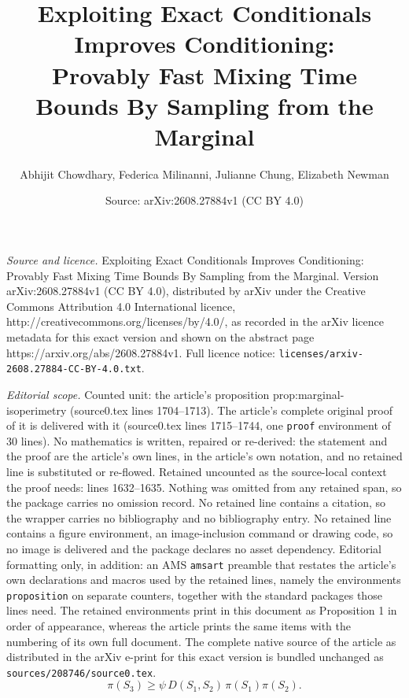 \documentclass[10pt,a4paper]{amsart}
\title{Exploiting Exact Conditionals Improves Conditioning: \\ Provably Fast Mixing Time Bounds By Sampling from the Marginal}
\author{Abhijit Chowdhary, Federica Milinanni, Julianne Chung, Elizabeth Newman}
\date{Source: arXiv:2608.27884v1 (CC BY 4.0)}
\begin{document}
\maketitle

\noindent\emph{Source and licence.} Exploiting Exact Conditionals Improves Conditioning: \\ Provably Fast Mixing Time Bounds By Sampling from the Marginal. Version arXiv:2608.27884v1 (CC BY 4.0), distributed by arXiv under the Creative Commons Attribution 4.0 International licence, http://creativecommons.org/licenses/by/4.0/, as recorded in the arXiv licence metadata for this exact version and shown on the abstract page https://arxiv.org/abs/2608.27884v1. Full licence notice: \texttt{licenses/arxiv-2608.27884-CC-BY-4.0.txt}.\par\smallskip

\noindent\textit{Editorial scope.} Counted unit: the article's proposition prop:marginal-isoperimetry (source0.tex lines 1704--1713). The article's complete original proof of it is delivered with it (source0.tex lines 1715--1744, one \texttt{proof} environment of 30 lines). No mathematics is written, repaired or re-derived: the statement and the proof are the article's own lines, in the article's own notation, and no retained line is substituted or re-flowed.  Retained uncounted as the source-local context the proof needs: lines 1632--1635.  Nothing was omitted from any retained span, so the package carries no omission record.  No retained line contains a citation, so the wrapper carries no bibliography and no bibliography entry.  No retained line contains a figure environment, an image-inclusion command or drawing code, so no image is delivered and the package declares no asset dependency.  Editorial formatting only, in addition: an AMS \texttt{amsart} preamble that restates the article's own declarations and macros used by the retained lines, namely the environments \texttt{proposition} on separate counters, together with the standard packages those lines need.  The retained environments print in this document as Proposition 1 in order of appearance, whereas the article prints the same items with the numbering of its own full document.  The complete native source of the article as distributed in the arXiv e-print for this exact version is bundled unchanged as \texttt{sources/208746/source0.tex}.
  \begin{equation}
    \label{eq:isoperimetric-inequality}
    \pi(S_3) \geq \psi\,D(S_1,S_2)\,\pi(S_1)\pi(S_2).
  \end{equation}
\end{document}

